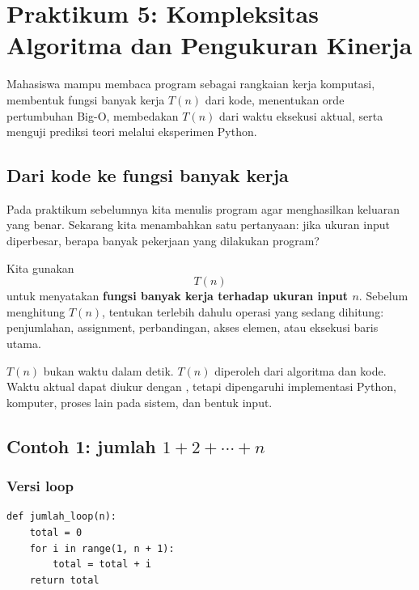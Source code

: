 \documentclass[11pt,a4paper]{report}
\newcommand{\kode}[1]{\texttt{\detokenize{#1}}}
\begin{document}
\chapter{Praktikum 5: Kompleksitas Algoritma dan Pengukuran Kinerja}

\begin{tujuanbox}
Mahasiswa mampu membaca program sebagai rangkaian kerja komputasi, membentuk fungsi banyak kerja $T(n)$ dari kode, menentukan orde pertumbuhan Big-O, membedakan $T(n)$ dari waktu eksekusi aktual, serta menguji prediksi teori melalui eksperimen Python.
\end{tujuanbox}

\section{Dari kode ke fungsi banyak kerja}

Pada praktikum sebelumnya kita menulis program agar menghasilkan keluaran yang benar.
Sekarang kita menambahkan satu pertanyaan: jika ukuran input diperbesar, berapa banyak
pekerjaan yang dilakukan program?

Kita gunakan
\[
T(n)
\]
untuk menyatakan \textbf{fungsi banyak kerja terhadap ukuran input $n$}.
Sebelum menghitung $T(n)$, tentukan terlebih dahulu operasi yang sedang dihitung:
penjumlahan, assignment, perbandingan, akses elemen, atau eksekusi baris utama.

\begin{catatanbox}
$T(n)$ bukan waktu dalam detik. $T(n)$ diperoleh dari algoritma dan kode.
Waktu aktual dapat diukur dengan \kode{timeit}, tetapi dipengaruhi implementasi Python,
komputer, proses lain pada sistem, dan bentuk input.
\end{catatanbox}

\section{Contoh 1: jumlah $1+2+\cdots+n$}

\subsection{Versi loop}

\begin{lstlisting}
def jumlah_loop(n):
    total = 0
    for i in range(1, n + 1):
        total = total + i
    return total
\end{lstlisting}
\end{document}
